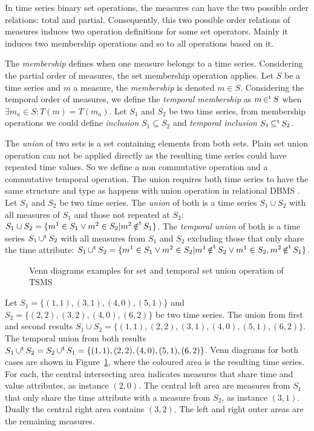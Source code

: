 In time series binary set operations, the measures can have the
two possible order relations: total and partial. Consequently, this two
possible order relations of measures induces two operation definitions
for some set operators.  Mainly it induces two membership operations
and so to all operations based on it. 


The \emph{membership} defines when one measure belongs to a time
series. Considering the partial order of measures, the set
membership operation applies. Let $S$ be a time series and $m$ a
measure, the \emph{membership} is denoted $m \in S$. Considering the
temporal order of measures, we define the \emph{temporal membership}
as $m \operatorname*{\in^t} S$ when $\exists m_a \in S : T(m) = T(m_a)$.  Let $S_1$
and $S_2$ be two time series, from membership operations we could
define \emph{inclusion} $S_1\subseteq S_2$ and \emph{temporal
  inclusion} $S_1\operatorname*{\subseteq^t} S_2$.


The \emph{union} of two sets is a set containing elements from both
sets. Plain set union operation can not be applied directly as the
resulting time series could have repeated time values.  So we define a
non commutative operation and a commutative temporal operation. The
union requires both time series to have the same structure and type as
happens with union operation in relational DBMS
\cite{date:introduction}. %
Let $S_1$ and $S_2$ be two time series. The \emph{union} of both is a
time series $S_1 \cup S_2$ with all measures of $S_1$ and those not
repeated at $S_2$: $S_1 \cup S_2 = \{m^1 \in S_1 \vee m^2 \in S_2 |
m^2 \operatorname*{\notin^t} S_1 \}$. The \emph{temporal union} of both is a time
series $S_1 \operatorname*{\cup^t} S_2$ with all measures from $S_1$ and $S_2$
excluding those that only share the time attribute: $S_1 \operatorname*{\cup^t} S_2 =
\{ m^1 \in S_1 \vee m^2 \in S_2 | m^1 \operatorname*{\notin^t} S_2 \vee m^1 \in S_2,
m^2 \operatorname*{\notin^t} S_1 \}$.


\begin{figure}
  \centering
  
  \caption{Venn diagrams examples for set and temporal set union
    operation of TSMS}
  \label{fig:model:venn}
\end{figure}


\begin{example}
  Let $S_1=\{(1,1),(3,1),(4,0),(5,1)\}$ and $S_2=\{(2,2),\allowbreak
  (3,2),(4,0),(6,2)\}$ be two time series. The union from first and
  second results $S_1 \cup S_2 = \{(1,1),(2,2),\allowbreak
  (3,1),\allowbreak (4,0),\allowbreak (5,1),(6,2)\}$. The temporal
  union from both results $S_1 \operatorname*{\cup^t} S_2 = S_2 \operatorname*{\cup^t} S_1 =
  \{(1,1),(2,2),(4,0),(5,1),\allowbreak (6,2)\}$. Venn diagrams for
  both cases are shown in Figure~\ref{fig:model:venn}, where the
  coloured area is the resulting time series. For each, the central
  intersecting area indicates measures that share time and value
  attributes, as instance $(2,0)$. The central left area are measures
  from $S_1$ that only share the time attribute with a measure from
  $S_2$, as instance $(3,1)$. Dually the central right area contains
  $(3,2)$. The left and right outer areas are the remaining measures.
 \end{example}




